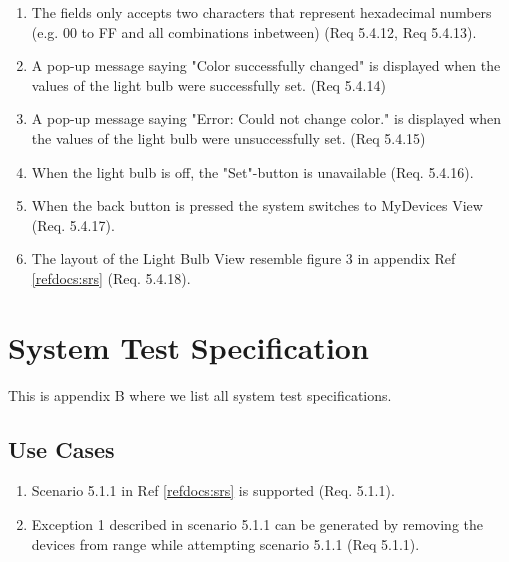 \documentclass[a4paper]{article}
\newlength{\testlabellength}
\newenvironment{testlist}{\begin{enumerate}[label=\bfseries Test \thesubsection.\arabic* , labelindent=0pt, labelwidth=\testlabellength , leftmargin=2cm]}{\end{enumerate}}
\begin{document}
\begin{appendices}
\begin{testlist}
    \item The fields only accepts two characters that represent hexadecimal numbers (e.g. 00 to FF and all combinations inbetween) (Req 5.4.12, Req 5.4.13).
    
    \item A pop-up message saying "Color successfully changed" is displayed when the values of the light bulb were successfully set. (Req 5.4.14)
    
    \item A pop-up message saying "Error: Could not change color." is displayed when the values of the light bulb were unsuccessfully set. (Req 5.4.15)
    
    
    \item When the light bulb is off, the "Set"-button is unavailable (Req. 5.4.16).
    
    \item When the back button is pressed the system switches to MyDevices View (Req. 5.4.17).
    
    \item The layout of the Light Bulb View resemble figure 3 in appendix  Ref \ref{refdocs:srs} (Req. 5.4.18).

\end{testlist}	

\newpage

\section{System Test Specification} \label{appendix:section:systemtest}
This is appendix B where we list all system test specifications.

\subsection{Use Cases}
\begin{testlist}
	\item Scenario 5.1.1 in Ref \ref{refdocs:srs} is supported (Req. 5.1.1).

	\item Exception 1 described in scenario 5.1.1 can be generated by removing the devices from range while attempting scenario 5.1.1 (Req 5.1.1).
	

\end{testlist}
\end{appendices}
\end{document}
